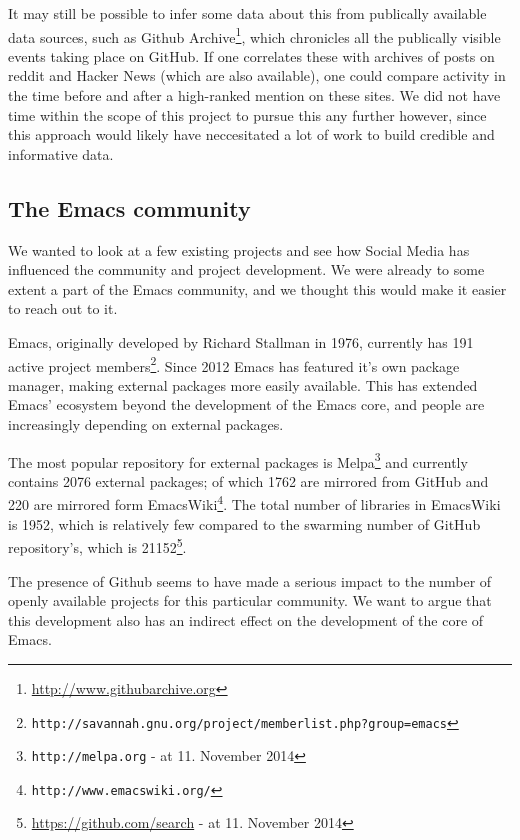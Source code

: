\documentclass[a4paper,11pt]{article} %
\begin{document}
It may still be possible to infer some data about this from publically
available data sources, such as Github
Archive\footnote{\url{http://www.githubarchive.org}}, which chronicles
all the publically visible events taking place on GitHub. If one
correlates these with archives of posts on reddit and Hacker News
(which are also available), one could compare activity in the time
before and after a high-ranked mention on these sites. We did not have
time within the scope of this project to pursue this any further
however, since this approach would likely have neccesitated a lot of
work to build credible and informative data.

\subsection{The Emacs community}

We wanted to look at a few existing projects and see how Social Media has
influenced the community and project development. We were already to some
extent a part of the Emacs community, and we thought this would make it
easier to reach out to it.

Emacs, originally developed by Richard Stallman in 1976, currently has
\num{191} active project
members\footnote{\texttt{http://savannah.gnu.org/project/memberlist.php?group=emacs}}.
Since \num{2012} Emacs has featured it's own package manager, making
external packages more easily available. This has extended Emacs' ecosystem
beyond the development of the Emacs core, and people are increasingly
depending on external packages.

The most popular repository for external packages is
Melpa\footnote{\texttt{http://melpa.org} - at 11. November 2014} and
currently contains \num{2076} external packages; of which \num{1762} are
mirrored from GitHub and \num{220} are mirrored form
EmacsWiki\footnote{\texttt{http://www.emacswiki.org/}}. The total number of
libraries in EmacsWiki is \num{1952}, which is relatively few compared to
the swarming number of GitHub repository's, which is
\num{21152}\footnote{\href{https://github.com/search?utf8=\%E2\%9C\%93\&q=language\%3Aemacs-lisp\&type=Repositories\&ref=searchresults}{https://github.com/search} - at 11. November 2014}.

The presence of Github seems to have made a serious impact to the number of
openly available projects for this particular community. We want to argue
that this development also has an indirect effect on the development of the
core of Emacs.
\end{document}

